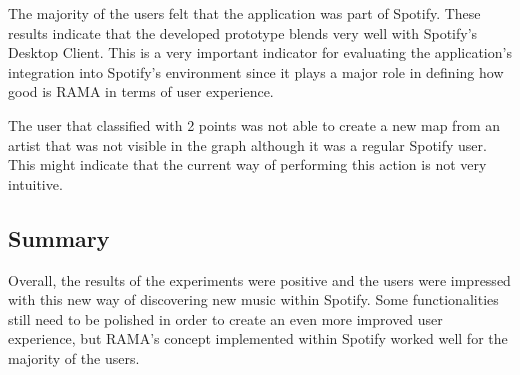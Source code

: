       The majority of the users felt that the application was part of Spotify.
      These results indicate that the developed prototype blends very well with Spotify's Desktop Client.
      This is a very important indicator for evaluating the application's integration into Spotify's environment since it plays a major role in defining how good is RAMA in terms of user experience.

      The user that classified with 2 points was not able to create a new map from an artist that was not visible in the graph although it was a regular Spotify user.
      This might indicate that the current way of performing this action is not very intuitive.
  

  \subsection{Summary}

    Overall, the results of the experiments were positive and the users were impressed with this new way of discovering new music within Spotify.
    Some functionalities still need to be polished in order to create an even more improved user experience, but RAMA's concept implemented within Spotify worked well for the majority of the users.
  
